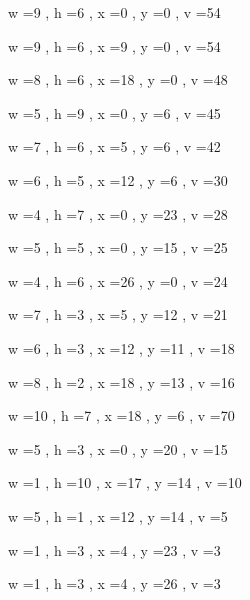 \documentclass[11pt]{article}
\begin{document}
w =9 , h =6 , x =0 , y =0 , v =54
\par
w =9 , h =6 , x =9 , y =0 , v =54
\par
w =8 , h =6 , x =18 , y =0 , v =48
\par
w =5 , h =9 , x =0 , y =6 , v =45
\par
w =7 , h =6 , x =5 , y =6 , v =42
\par
w =6 , h =5 , x =12 , y =6 , v =30
\par
w =4 , h =7 , x =0 , y =23 , v =28
\par
w =5 , h =5 , x =0 , y =15 , v =25
\par
w =4 , h =6 , x =26 , y =0 , v =24
\par
w =7 , h =3 , x =5 , y =12 , v =21
\par
w =6 , h =3 , x =12 , y =11 , v =18
\par
w =8 , h =2 , x =18 , y =13 , v =16
\par
w =10 , h =7 , x =18 , y =6 , v =70
\par
w =5 , h =3 , x =0 , y =20 , v =15
\par
w =1 , h =10 , x =17 , y =14 , v =10
\par
w =5 , h =1 , x =12 , y =14 , v =5
\par
w =1 , h =3 , x =4 , y =23 , v =3
\par
w =1 , h =3 , x =4 , y =26 , v =3
\par
\newpage
\end{document}
